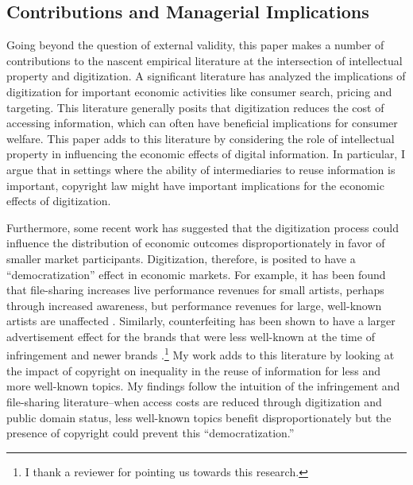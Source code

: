\documentclass[11pt]{article}
\begin{document}
\subsection{Contributions and Managerial Implications}


Going beyond the question of external validity, this paper makes a number of contributions to the nascent empirical literature at the intersection of intellectual property and digitization. A significant literature has analyzed the implications of digitization for important economic activities like consumer search, pricing and targeting. This literature generally posits that digitization reduces the cost of accessing information, which can often have beneficial implications for consumer welfare. This paper adds to this literature by considering the role of intellectual property in influencing the economic effects of digital information. In particular, I argue that in settings where the ability of intermediaries to reuse information is important, copyright law might have important implications for the economic effects of digitization. 

Furthermore, some recent work has suggested that the digitization process could influence the distribution of economic outcomes disproportionately in favor of smaller market participants. Digitization, therefore, is posited to have a ``democratization'' effect in economic markets. For example, it has been found that file-sharing increases live performance revenues for small artists, perhaps through increased awareness, but performance revenues for large, well-known artists are unaffected \citep{mortimer_supply_2012}. Similarly, counterfeiting has been shown to have a larger advertisement effect for the brands that were less well-known at the time of infringement and newer brands \citep{qian_counterfeiters:_2014}.\footnote{I thank a reviewer for pointing us towards this research.} My work adds to this literature by looking at the impact of copyright on inequality in the reuse of information for less and more well-known topics. My findings follow the intuition of the infringement and file-sharing literature--when access costs are reduced through digitization and public domain status, less well-known topics benefit disproportionately but the presence of copyright could prevent this ``democratization.''


\end{document}
